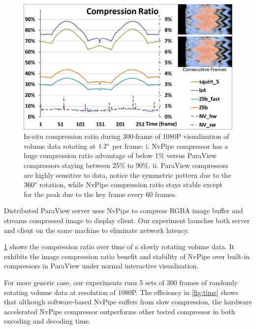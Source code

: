 \documentclass{vgtc}                          %
\begin{document}
\begin{figure}[htb]
  \centering
  \includegraphics[width=\columnwidth]{compressRatio.eps}
  \caption{In-situ compression ratio during 300-frame of 1080P visualization of volume data rotating at \(1.2\degree\) per frame: i. NvPipe compressor has a huge compression ratio advantage of below 1\% versus ParaView compressors staying between 25\% to 90\%. ii. ParaView compressors are highly sensitive to data, notice the symmetric pattern due to the \(360\degree\) rotation, while NvPipe compression ratio stays stable except for the peak due to the key frame every 60 frames. }
  \label{fig:compressRatio}
\end{figure}

Distributed ParaView server uses NvPipe to compress RGBA image buffer and streams compressed image to display client. Our experiment launches both server and client on the same machine to eliminate network latency.

\cref{fig:compressRatio} shows the compression ratio over time of a slowly rotating volume data. It exhibits the image compression ratio benefit and stability of NvPipe over built-in compressors in ParaView under normal interactive visualization.

For more generic case, our experiments runs 5 sets of 300 frames of randomly rotating volume data at resolution of 1080P.
The efficiency in \cref{fig:time} shows that although software-based NvPipe suffers from slow compression, the hardware accelerated NvPipe compressor outperforms other tested compressor in both encoding and decoding time.
\end{document}
